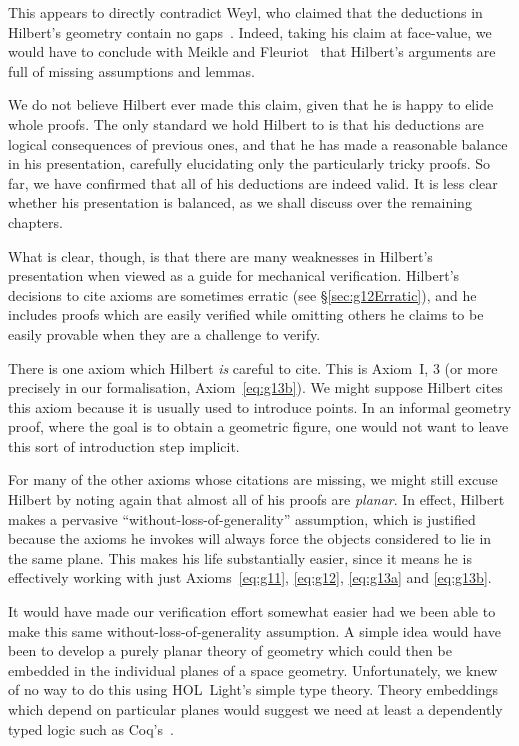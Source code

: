 This appears to directly contradict Weyl, who claimed that the deductions in Hilbert's geometry contain no gaps~\cite{TableChairMug}. Indeed, taking his claim at face-value, we would have to conclude with Meikle and Fleuriot~\cite{MeikleFleuriotFormalizingHilbert} that Hilbert's arguments are full of missing assumptions and lemmas. 

We do not believe Hilbert ever made this claim, given that he is happy to elide whole proofs. The only standard we hold Hilbert to is that his deductions are logical consequences of previous ones, and that he has made a reasonable balance in his presentation, carefully elucidating only the particularly tricky proofs. So far, we have confirmed that all of his deductions are indeed valid. It is less clear whether his presentation is balanced, as we shall discuss over the remaining chapters. 

What is clear, though, is that there are many weaknesses in Hilbert's presentation when viewed as a guide for mechanical verification. Hilbert's decisions to cite axioms are sometimes erratic (see \S\ref{sec:g12Erratic}), and he includes proofs which are easily verified while omitting others he claims to be easily provable when they are a challenge to verify.

There is one axiom which Hilbert \emph{is} careful to cite. This is Axiom~I, 3 (or more precisely in our formalisation, Axiom~\ref{eq:g13b}). We might suppose Hilbert cites this axiom because it is usually used to introduce points. In an informal geometry proof, where the goal is to obtain a geometric figure, one would not want to leave this sort of introduction step implicit.

\label{sec:PlanarProofs}For many of the other axioms whose citations are missing, we might still excuse Hilbert by noting again that almost all of his proofs are \emph{planar}. In effect, Hilbert makes a pervasive ``without-loss-of-generality'' assumption, which is justified because the axioms he invokes will always force the objects considered to lie in the same plane. This makes his life substantially easier, since it means he is effectively working with just Axioms~\ref{eq:g11}, \ref{eq:g12}, \ref{eq:g13a} and \ref{eq:g13b}.

It would have made our verification effort somewhat easier had we been able to make this same without-loss-of-generality assumption. A simple idea would have been to develop a purely planar theory of geometry which could then be embedded in the individual planes of a space geometry. Unfortunately, we knew of no way to do this using HOL~Light's simple type theory. Theory embeddings which depend on particular planes would suggest we need at least a dependently typed logic such as Coq's~\cite{Coq}.

